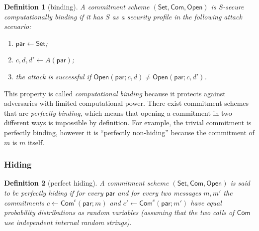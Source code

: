 \documentclass{article}
\newtheorem{definition}{Definition}[section]
\newcommand{\setup}[0]{\mathsf{Set}}
\newcommand{\commit}[0]{\mathsf{Com}}
\newcommand{\open}[0]{\mathsf{Open}}
\newcommand{\commitc}[0]{\mathsf{Com}^{c}}
\newcommand{\param}[0]{\mathsf{par}}
\begin{document}
\begin{definition}[binding]
A commitment scheme $(\setup, \commit, \open)$ is $S$-secure computationally binding if it has $S$ as a security profile in the following attack scenario:
\begin{enumerate}
\item $\param\gets\setup$;
\item $c,d,d'\gets A(\param)$;
\item the attack is successful if $\open(\param; c, d)\neq\open(\param; c, d')$.
\end{enumerate}
\end{definition}

\noindent This property is called \emph{computational binding} because it protects against adversaries with limited computational power. There exist commitment schemes that are \emph{perfectly binding}, which means that opening a commitment in two different ways is impossible by definition. For example, the trivial commitment is perfectly binding, however it is ``perfectly non-hiding'' because the commitment of $m$ is $m$ itself.

\subsubsection{Hiding}

\begin{definition}[perfect hiding]
A commitment scheme $(\setup, \commit, \open)$ is said to be perfectly hiding if for every $\param$ and for every two messages $m,m'$ the commitments $c\gets \commitc(\param; m)$ and $c'\gets \commitc(\param; m')$ have equal probability distributions as random variables (assuming that the two calls of $\commit$ use independent internal random strings).
\end{definition}
\end{document}
